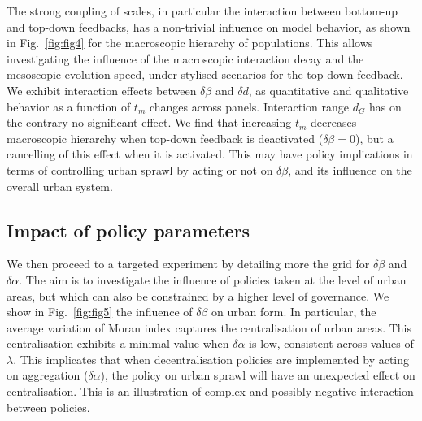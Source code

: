 \documentclass[ijgi,article,submit,moreauthors,pdftex]{Definitions/mdpi}
\begin{document}



The strong coupling of scales, in particular the interaction between bottom-up and top-down feedbacks, has a non-trivial influence on model behavior, as shown in Fig.~\ref{fig:fig4} for the macroscopic hierarchy of populations. This allows investigating the influence of the macroscopic interaction decay and the mesoscopic evolution speed, under stylised scenarios for the top-down feedback. We exhibit interaction effects between $\delta \beta$ and $\delta d$, as quantitative and qualitative behavior as a function of $t_m$ changes across panels. Interaction range $d_G$ has on the contrary no significant effect. We find that increasing $t_m$ decreases macroscopic hierarchy when top-down feedback is deactivated ($\delta \beta=0$), but a cancelling of this effect when it is activated. This may have policy implications in terms of controlling urban sprawl by acting or not on $\delta \beta$, and its influence on the overall urban system.





\subsection{Impact of policy parameters}




We then proceed to a targeted experiment by detailing more the grid for $\delta \beta$ and $\delta \alpha$. The aim is to investigate the influence of policies taken at the level of urban areas, but which can also be constrained by a higher level of governance. We show in Fig.~\ref{fig:fig5} the influence of $\delta \beta$ on urban form. In particular, the average variation of Moran index captures the centralisation of urban areas. This centralisation exhibits a minimal value when $\delta \alpha$ is low, consistent across values of $\lambda$. This implicates that when decentralisation policies are implemented by acting on aggregation ($\delta \alpha$), the policy on urban sprawl will have an unexpected effect on centralisation. This is an illustration of complex and possibly negative interaction between policies.
\end{document}
